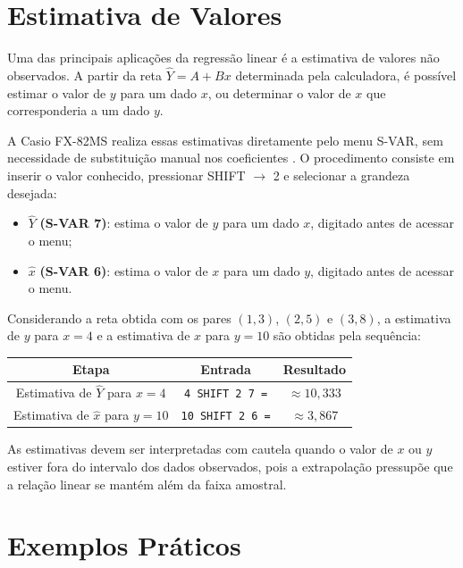 \section{Estimativa de Valores}

Uma das principais aplicações da regressão linear é a estimativa de valores não observados. A partir da reta $\hat{Y} = A + Bx$ determinada pela calculadora, é possível estimar o valor de $y$ para um dado $x$, ou determinar o valor de $x$ que corresponderia a um dado $y$.

A Casio FX-82MS realiza essas estimativas diretamente pelo menu S-VAR, sem necessidade de substituição manual nos coeficientes \cite{casio2004}. O procedimento consiste em inserir o valor conhecido, pressionar SHIFT $\to$ 2 e selecionar a grandeza desejada:

\begin{itemize}
    \item $\hat{Y}$ \textbf{(S-VAR 7)}: estima o valor de $y$ para um
    dado $x$, digitado antes de acessar o menu;
    \item $\hat{x}$ \textbf{(S-VAR 6)}: estima o valor de $x$ para um
    dado $y$, digitado antes de acessar o menu.
\end{itemize}

Considerando a reta obtida com os pares $(1, 3)$, $(2, 5)$ e $(3, 8)$, a estimativa de $y$ para $x = 4$ e a estimativa de $x$ para $y = 10$ são obtidas pela sequência:

\begin{table}[H]
    \centering
    \begin{tabular}{|c|c|c|}
        \hline
        \textbf{Etapa} & \textbf{Entrada} & \textbf{Resultado} \\ \hline
        Estimativa de $\hat{Y}$ para $x = 4$ & \texttt{4 SHIFT 2 7 =} & $\approx 10{,}333$ \\
        Estimativa de $\hat{x}$ para $y = 10$ & \texttt{10 SHIFT 2 6 =} & $\approx 3{,}867$ \\ \hline
    \end{tabular}
\end{table}

As estimativas devem ser interpretadas com cautela quando o valor de $x$ ou $y$ estiver fora do intervalo dos dados observados, pois a extrapolação pressupõe que a relação linear se mantém além da faixa amostral.

\section{Exemplos Práticos}

